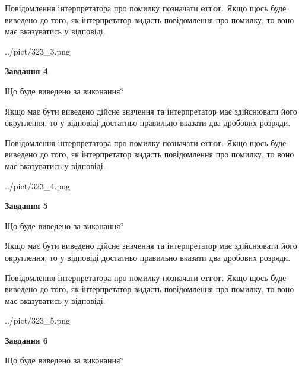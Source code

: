 \documentclass[12pt, ukrainian]{article}
\begin{document}
{\begin {Large}
Повідомлення інтерпретатора про помилку позначати \textbf{error}.
Якщо щось буде виведено до того, як інтерпретатор видасть повідомлення про помилку, 
то воно має вказуватись у відповіді. \par

\begin{center}
	{../pict/323_3.png}
\end{center}
\newpage

{\begin {center}\textbf{Завдання 4}\end {center}}\par
Що буде виведено за виконання? \par

Якщо має бути виведено дійсне значення та інтерпретатор має здійснювати його округлення, 
то у відповіді достатньо правильно вказати два дробових розряди.

Повідомлення інтерпретатора про помилку позначати \textbf{error}.
Якщо щось буде виведено до того, як інтерпретатор видасть повідомлення про помилку, 
то воно має вказуватись у відповіді. \par

\begin{center}
	{../pict/323_4.png}
\end{center}
\newpage

{\begin {center}\textbf{Завдання 5}\end {center}}\par
Що буде виведено за виконання? \par

Якщо має бути виведено дійсне значення та інтерпретатор має здійснювати його округлення, 
то у відповіді достатньо правильно вказати два дробових розряди.

Повідомлення інтерпретатора про помилку позначати \textbf{error}.
Якщо щось буде виведено до того, як інтерпретатор видасть повідомлення про помилку, 
то воно має вказуватись у відповіді. \par

\begin{center}
	{../pict/323_5.png}
\end{center}
\newpage

{\begin {center}\textbf{Завдання 6}\end {center}}\par
Що буде виведено за виконання? \par


\end{Large}}
\end{document}
